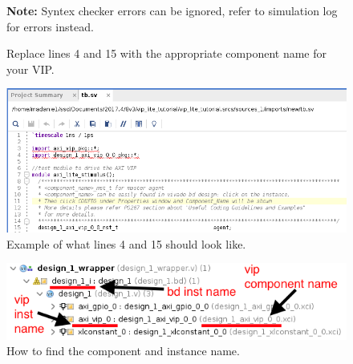 \documentclass[12pt]{article}
\begin{document}
\begin{enumerate}
\begin{figure}[H]
		  \caption{Replace lines 4 and 15 with the appropriate component name for your VIP.}
			\textbf{Note: }Syntex checker errors can be ignored, refer to simulation log for errors instead.
		  \label{fig:componentname1}
		\end{figure}
		\begin{figure}[H]
		  \centering
		  \includegraphics[scale=0.5]{componentname2.png}
		  \caption{Example of what lines 4 and 15 should look like.}
		  \label{fig:componentname2}
		\end{figure}
		\begin{figure}[H]
		  \centering
		  \includegraphics[scale=0.5]{filehierarchy2.png}
		  \caption{How to find the component and instance name.}
		  \label{fig:findnames}
		\end{figure}
		

\end{enumerate}
\end{document}
